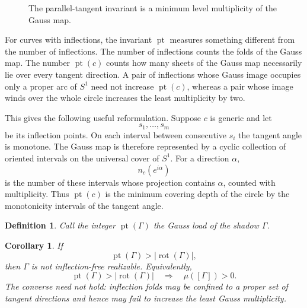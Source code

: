 \documentclass[11pt]{article}
\newtheorem{corollary}[theorem]{Corollary}
\newtheorem{definition}[theorem]{Definition}
\newcommand{\rot}{\operatorname{rot}}
\newcommand{\parnum}{\operatorname{pt}}
\begin{document}
\begin{figure}[t]
\centering
{}
\caption{The parallel-tangent invariant is a minimum level multiplicity of the Gauss map.}
\label{fig:gaussfolds}
\end{figure}

For curves with inflections, the invariant $\parnum$ measures something different from the number of inflections.  The number of inflections counts the folds of the Gauss map.  The number $\parnum(c)$ counts how many sheets of the Gauss map necessarily lie over every tangent direction.  A pair of inflections whose Gauss image occupies only a proper arc of $S^1$ need not increase $\parnum(c)$, whereas a pair whose image winds over the whole circle increases the least multiplicity by two.

This gives the following useful reformulation.  Suppose $c$ is generic and let
\[
 s_1,\ldots,s_m
\]
be its inflection points.  On each interval between consecutive $s_i$ the tangent angle is monotone.  The Gauss map is therefore represented by a cyclic collection of oriented intervals on the universal cover of $S^1$.  For a direction $\alpha$,
\[
 n_c(e^{i\alpha})
\]
is the number of these intervals whose projection contains $\alpha$, counted with multiplicity.  Thus $\parnum(c)$ is the minimum covering depth of the circle by the monotonicity intervals of the tangent angle.

\begin{definition}\label{def:gaussload}
Call the integer $\parnum(\Gamma)$ the \emph{Gauss load} of the shadow $\Gamma$.
\end{definition}

\begin{corollary}\label{cor:gaussobstructs}
If
\[
 \parnum(\Gamma)>|\rot(\Gamma)|,
\]
then $\Gamma$ is not inflection-free realizable.  Equivalently,
\[
 \parnum(\Gamma)>|\rot(\Gamma)| \quad\Longrightarrow\quad \mu([\Gamma])>0.
\]
The converse need not hold: inflection folds may be confined to a proper set of tangent directions and hence may fail to increase the least Gauss multiplicity.
\end{corollary}
\end{document}
